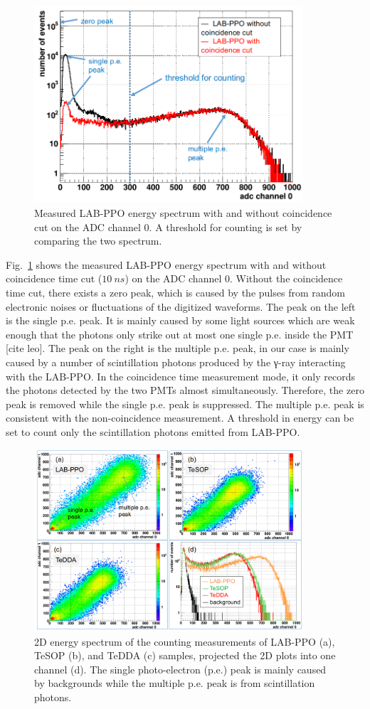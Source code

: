 \begin{figure}[htbp]
	\centering	
	\includegraphics[width=10cm]{TeLScoinCut.png}
	\caption{Measured LAB-PPO energy spectrum with and without coincidence cut on the ADC channel 0.  A threshold for counting is set by comparing the two spectrum.}
	\label{teLScoinCut}
\end{figure}

Fig.~\ref{teLScoinCut} shows the measured LAB-PPO energy spectrum with and without coincidence time cut ($10~ns$) on the ADC channel 0.  Without the coincidence time cut, there exists a zero peak, which is caused by the pulses from random electronic noises or fluctuations of the digitized waveforms. The peak on the left is the single p.e. peak. It is mainly caused by some light sources which are weak enough that the photons only strike out at most one single p.e. inside the PMT [cite leo].  The peak on the right is the multiple p.e. peak, in our case is mainly caused by a number of scintillation photons produced by the γ-ray interacting with the LAB-PPO. In the coincidence time measurement mode, it only records the photons detected by the two PMTs almost simultaneously. Therefore, the zero peak is removed while the single p.e. peak is suppressed. The multiple p.e. peak is consistent with the non-coincidence measurement. A threshold in energy can be set to count only the scintillation photons emitted from LAB-PPO. 


\begin{figure}[htbp]
	\centering	
	\includegraphics[width=10cm]{TeLS_2Denergy.png}
	\caption{ 2D energy spectrum of the counting measurements of LAB-PPO (a), TeSOP (b), and TeDDA (c) samples, projected the 2D plots into one channel (d). The single photo-electron (p.e.) peak is mainly caused by backgrounds while the multiple p.e. peak is from scintillation photons.}
	\label{teLSresults}
\end{figure}

